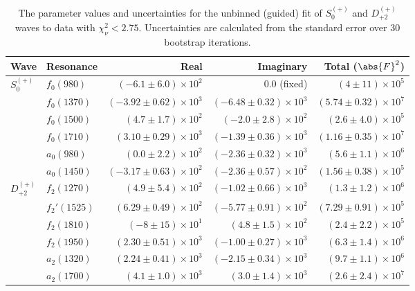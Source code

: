 \begin{table}
    \begin{center}
        \begin{tabular}{llrrr}\toprule
        Wave & Resonance & Real & Imaginary & Total ($\abs{F}^2$) \\\midrule
$S_{0}^{(+)}$ & $f_{0}(980)$ & $(-6.1 \pm 6.0) \times 10^{2}$ & $0.0$ (fixed) & $(4 \pm 11) \times 10^{5}$ \\
 & $f_{0}(1370)$ & $(-3.92 \pm 0.62) \times 10^{3}$ & $(-6.48 \pm 0.32) \times 10^{3}$ & $(5.74 \pm 0.32) \times 10^{7}$ \\
 & $f_{0}(1500)$ & $(4.7 \pm 1.7) \times 10^{2}$ & $(-2.0 \pm 2.8) \times 10^{2}$ & $(2.6 \pm 4.0) \times 10^{5}$ \\
 & $f_{0}(1710)$ & $(3.10 \pm 0.29) \times 10^{3}$ & $(-1.39 \pm 0.36) \times 10^{3}$ & $(1.16 \pm 0.35) \times 10^{7}$ \\
 & $a_{0}(980)$ & $(0.0 \pm 2.2) \times 10^{2}$ & $(-2.36 \pm 0.32) \times 10^{3}$ & $(5.6 \pm 1.1) \times 10^{6}$ \\
 & $a_{0}(1450)$ & $(-3.17 \pm 0.63) \times 10^{2}$ & $(-2.36 \pm 0.57) \times 10^{2}$ & $(1.56 \pm 0.38) \times 10^{5}$ \\
$D_{+2}^{(+)}$ & $f_{2}(1270)$ & $(4.9 \pm 5.4) \times 10^{2}$ & $(-1.02 \pm 0.66) \times 10^{3}$ & $(1.3 \pm 1.2) \times 10^{6}$ \\
 & $f_{2}'(1525)$ & $(6.29 \pm 0.49) \times 10^{2}$ & $(-5.77 \pm 0.91) \times 10^{2}$ & $(7.29 \pm 0.91) \times 10^{5}$ \\
 & $f_{2}(1810)$ & $(-8 \pm 15) \times 10^{1}$ & $(4.8 \pm 1.5) \times 10^{2}$ & $(2.4 \pm 2.2) \times 10^{5}$ \\
 & $f_{2}(1950)$ & $(2.30 \pm 0.51) \times 10^{3}$ & $(-1.00 \pm 0.27) \times 10^{3}$ & $(6.3 \pm 1.4) \times 10^{6}$ \\
 & $a_{2}(1320)$ & $(2.24 \pm 0.41) \times 10^{3}$ & $(-2.15 \pm 0.34) \times 10^{3}$ & $(9.7 \pm 1.1) \times 10^{6}$ \\
 & $a_{2}(1700)$ & $(4.1 \pm 1.0) \times 10^{3}$ & $(3.0 \pm 1.4) \times 10^{3}$ & $(2.6 \pm 2.4) \times 10^{7}$ \\\bottomrule
        \end{tabular}
    \caption{The parameter values and uncertainties for the unbinned (guided) fit of $S_{0}^{(+)}$ and $D_{+2}^{(+)}$ waves to data with $\chi^2_\nu < 2.75$. Uncertainties are calculated from the standard error over $30$ bootstrap iterations.}\label{tab:unbinned-fit-chisqdof-2.8-guided-Sp0p-Dp2p}
    \end{center}
\end{table}

